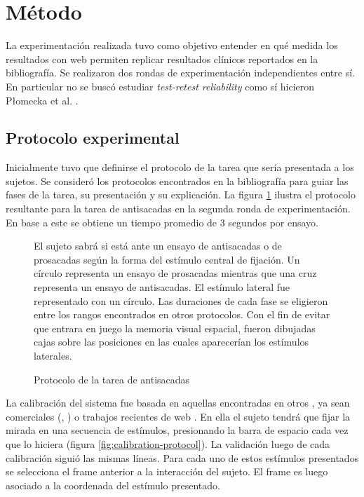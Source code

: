 \section{Método}

La experimentación realizada tuvo como objetivo entender en qué medida los
resultados con \eyetracking web permiten replicar resultados clínicos
reportados en la bibliografía.
Se realizaron dos rondas de experimentación independientes entre sí.
En particular no se buscó estudiar \textit{test-retest reliability} como sí
hicieron P{\l}omecka et al. \cite{plomecka_2020_retest_reliability}.

\subsection{Protocolo experimental}

Inicialmente tuvo que definirse el protocolo de la tarea que sería presentada a
los sujetos.
Se consideró los protocolos encontrados en la bibliografía
\cite{munoz_2004_look_away, unsworth_2011_distribution_analysis,
olincy_1997_age_diminishes_performance} para guiar las fases de la tarea, su
presentación y su explicación.
La figura \ref{fig:antisaccades-protocol} ilustra el protocolo resultante para
la tarea de antisacadas en la segunda ronda de experimentación.
En base a este se obtiene un tiempo promedio de 3 segundos por ensayo.

\begin{figure}
    \centering

    El sujeto sabrá si está ante un ensayo de antisacadas o de prosacadas según
    la forma del estímulo central de fijación.
    Un círculo representa un ensayo de prosacadas mientras que una cruz
    representa un ensayo de antisacadas.
    El estímulo lateral fue representado con un círculo.
    Las duraciones de cada fase se eligieron entre los rangos encontrados en
    otros protocolos.
    Con el fin de evitar que entrara en juego la memoria visual espacial,
    fueron dibujadas cajas sobre las posiciones en las cuales aparecerían los
    estímulos laterales.

    \caption{Protocolo de la tarea de antisacadas}
    \label{fig:antisaccades-protocol}
\end{figure}

La calibración del sistema fue basada en aquellas encontradas en otros
\eyetrackers, ya sean \eyetrackers comerciales (\tobii, \eyelink) o trabajos
recientes de \eyetracking web \cite{xu_2015_turker_gaze,
papoutsaki_2016_webgazer}.
En ella el sujeto tendrá que fijar la mirada en una secuencia de estímulos,
presionando la barra de espacio cada vez que lo hiciera (figura
\ref{fig:calibration-protocol}).
La validación luego de cada calibración siguió las mismas líneas.
Para cada uno de estos estímulos presentados se selecciona el frame anterior a
la interacción del sujeto.
El frame es luego asociado a la coordenada del estímulo presentado.


